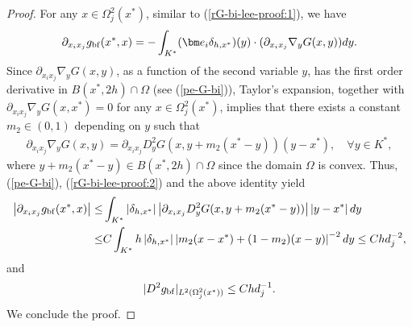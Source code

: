 \documentclass[1996/10/24]{amsart}
\theoremstyle{definition}
\numberwithin{equation}{section}
\begin{document}
\begin{proof}
For any $x\in\Omega_j^2(x^{\ast})$, similar to (\ref{rG-bi-lee-proof:1}), we have
\begin{align}
\partial_{x_ix_j}g_{{\rm bf}}(x^{\ast},x)=-\int_{K^{\ast}}({\bm e}_i\delta_{h,x^{\ast}})(y)\cdot(\partial_{x_ix_j}\nabla_yG(x,y)) dy.\label{rG-bi-lee-proof:2}
\end{align}
Since $\partial_{x_ix_j}\nabla_yG(x,y)$, as a function of the second variable $y$, has the first order derivative in $B(x^{\ast},2h)\cap\Omega$ (see (\ref{pe-G-bi})),
Taylor's expansion, together with $\partial_{x_ix_j}\nabla_yG(x,x^{\ast})=0$ for any $x\in\Omega_j^2(x^{\ast})$, implies that there exists a constant
$m_2\in(0,1)$ depending on $y$ such that
\begin{align*}
\partial_{x_ix_j}\nabla_yG(x,y)=\partial_{x_ix_j}D_y^2G(x,y+m_2(x^{\ast}-y))(y-x^{\ast}),\quad \forall y\in K^{\ast},
\end{align*}
where $y+m_2(x^{\ast}-y)\in B(x^{\ast},2h)\cap\Omega$ since the domain $\Omega$ is convex.
Thus, (\ref{pe-G-bi}), (\ref{rG-bi-lee-proof:2}) and the above identity yield
\begin{align*}
\left|\partial_{x_ix_j}g_{{\rm bf}}(x^{\ast},x)\right|\leq&\int_{K^{\ast}}\left|\delta_{h,x^{\ast}}\right|\left|\partial_{x_ix_j}D_y^2G(x,y+m_2(x^{\ast}-y))\right|\left|y-x^{\ast}\right|dy\\
\leq&C\int_{K^{\ast}}h\left|\delta_{h,x^{\ast}}\right|\left|m_2(x-x^{\ast})+(1-m_2)(x-y)\right|^{-2} dy\leq Chd_j^{-2},
\end{align*}
and
\begin{align*}
|D^2 g_{{\rm bf}}|_{L^2(\Omega_j^2(x^{\ast}))}\leq Chd_j^{-1}.
\end{align*}
We conclude the proof.
\end{proof}
\end{document}
